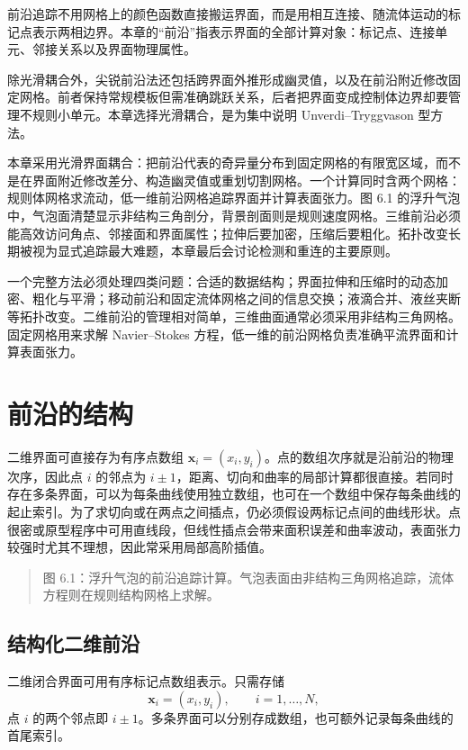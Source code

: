 \documentclass[11pt,a4paper,openany,fontset=none]{ctexbook}
\begin{document}
前沿追踪不用网格上的颜色函数直接搬运界面，而是用相互连接、随流体运动的标记点表示两相边界。本章的“前沿”指表示界面的全部计算对象：标记点、连接单元、邻接关系以及界面物理属性。

除光滑耦合外，尖锐前沿法还包括跨界面外推形成幽灵值，以及在前沿附近修改固定网格。前者保持常规模板但需准确跳跃关系，后者把界面变成控制体边界却要管理不规则小单元。本章选择光滑耦合，是为集中说明 Unverdi--Tryggvason 型方法。

本章采用光滑界面耦合：把前沿代表的奇异量分布到固定网格的有限宽区域，而不是在界面附近修改差分、构造幽灵值或重划切割网格。一个计算同时含两个网格：规则体网格求流动，低一维前沿网格追踪界面并计算表面张力。图 6.1 的浮升气泡中，气泡面清楚显示非结构三角剖分，背景剖面则是规则速度网格。三维前沿必须能高效访问角点、邻接面和界面属性；拉伸后要加密，压缩后要粗化。拓扑改变长期被视为显式追踪最大难题，本章最后会讨论检测和重连的主要原则。

一个完整方法必须处理四类问题：合适的数据结构；界面拉伸和压缩时的动态加密、粗化与平滑；移动前沿和固定流体网格之间的信息交换；液滴合并、液丝夹断等拓扑改变。二维前沿的管理相对简单，三维曲面通常必须采用非结构三角网格。固定网格用来求解 Navier--Stokes 方程，低一维的前沿网格负责准确平流界面和计算表面张力。

\section{前沿的结构}

二维界面可直接存为有序点数组 $\bm x_i=(x_i,y_i)$。点的数组次序就是沿前沿的物理次序，因此点 $i$ 的邻点为 $i\pm1$，距离、切向和曲率的局部计算都很直接。若同时存在多条界面，可以为每条曲线使用独立数组，也可在一个数组中保存每条曲线的起止索引。为了求切向或在两点之间插点，仍必须假设两标记点间的曲线形状。点很密或原型程序中可用直线段，但线性插点会带来面积误差和曲率波动，表面张力较强时尤其不理想，因此常采用局部高阶插值。

\begin{quote}\small 图 6.1：浮升气泡的前沿追踪计算。气泡表面由非结构三角网格追踪，流体方程则在规则结构网格上求解。\end{quote}
\subsection{结构化二维前沿}

二维闭合界面可用有序标记点数组表示。只需存储
\begin{equation}
\bm x_i=(x_i,y_i),\qquad i=1,\ldots,N,
\tag{6.1}
\end{equation}
点 $i$ 的两个邻点即 $i\pm1$。多条界面可以分别存成数组，也可额外记录每条曲线的首尾索引。
\end{document}
